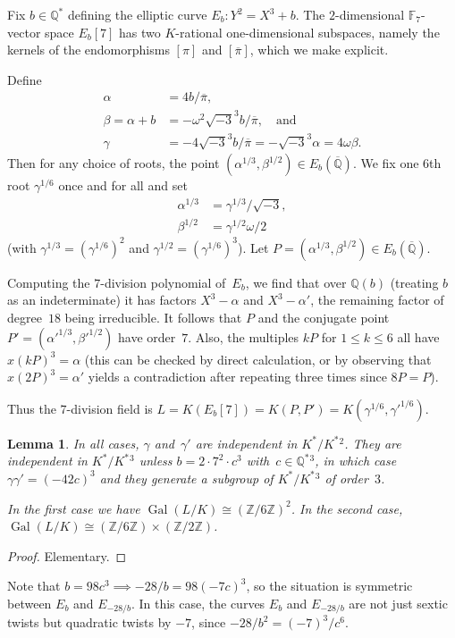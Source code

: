 \documentclass[12pt]{amsart}
\newcommand{\F}{\mathbb{F}}
\newcommand{\Q}{\mathbb{Q}}
\newcommand{\Z}{\mathbb{Z}}
\newcommand{\Qbar}{{\overline{\Q}}}
\DeclareMathOperator{\Gal}{Gal}
\def\w{\omega}
\def\r3{\sqrt{-3}}
\def\pibar{\overline{\pi}}
\numberwithin{equation}{section}
\newtheorem{lemma}[theorem]{Lemma}
\theoremstyle{definition}
\theoremstyle{remark}
\begin{document}
Fix $b\in\Q^*$ defining the elliptic curve $E_b: Y^2=X^3+b$.  The
$2$-dimensional $\F_7$-vector space $E_b[7]$ has two $K$-rational
one-dimensional subspaces, namely the kernels of the endomorphisms
$[\pi]$ and $[\pibar]$, which we make explicit.

Define
\begin{align}
\alpha&=4b/\pibar,\\
\beta=\alpha+b&=-\w^2\r3^3b/\pibar,\quad\text{and}\\
\gamma&=-4\r3^3b/\pibar = -\r3^3\alpha = 4\w\beta.
\end{align}
Then for any choice of roots, the point $(\alpha^{1/3},\beta^{1/2})\in
E_b(\Qbar)$.  We fix one $6$th root $\gamma^{1/6}$ once and for all
and set
\begin{align}
\alpha^{1/3} &= \gamma^{1/3}/\r3,\\
\beta^{1/2} &= \gamma^{1/2}\w/2
\end{align}
(with $\gamma^{1/3}=(\gamma^{1/6})^2$ and $\gamma^{1/2}=(\gamma^{1/6})^3$).  Let
$P=(\alpha^{1/3},\beta^{1/2})\in E_b(\Qbar)$.

Computing the $7$-division polynomial of~$E_b$, we find that over
$\Q(b)$ (treating $b$ as an indeterminate) it has factors $X^3-\alpha$
and $X^3-\alpha'$, the remaining factor of degree~$18$ being
irreducible.  It follows that $P$ and the conjugate point
$P'=(\alpha'^{1/3},\beta'^{1/2})$ have order~$7$.  Also, the multiples
$kP$ for $1\le k\le6$ all have $x(kP)^3=\alpha$ (this can be checked
by direct calculation, or by observing that $x(2P)^3=\alpha'$ yields a
contradiction after repeating three times since $8P=P$).

Thus the $7$-division field is
$L=K(E_b[7])=K(P,P')=K(\gamma^{1/6},\gamma'^{1/6})$.

\begin{lemma}In all cases, $\gamma$ and~$\gamma'$ are independent in
  $K^*/K^*{}^2$.  They are independent in $K^*/K^*{}^3$ unless
  $b=2\cdot7^2\cdot c^3$ with~$c\in\Q^*{}^3$, in which case
  $\gamma\gamma'=(-42c)^3$ and they generate a subgroup of $K^*/K^*{}^3$
  of order~$3$.

In the first case we have $\Gal(L/K)\cong(\Z/6\Z)^2$.  In the second
case, $\Gal(L/K)\cong(\Z/6\Z)\times(\Z/2\Z)$.
\end{lemma}
\begin{proof}
Elementary.
\end{proof}
Note that $b=98c^3\implies -28/b=98(-7c)^3$, so the situation is
symmetric between $E_b$ and $E_{-28/b}$.  In this case, the curves
$E_b$ and $E_{-28/b}$ are not just sextic twists but quadratic twists
by $-7$, since $-28/b^2=(-7)^3/c^6$.
\end{document}
